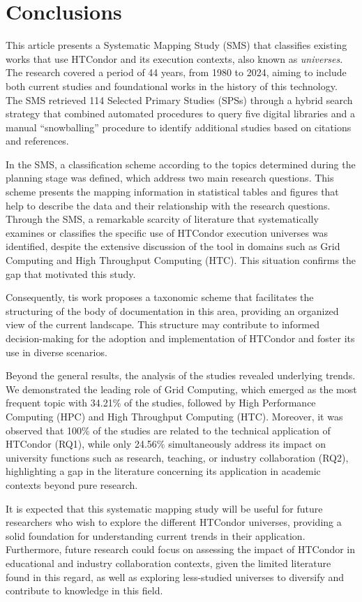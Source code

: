 \section{Conclusions}\label{sec:conclusiones}

This article presents a Systematic Mapping Study (SMS) that classifies existing works that use HTCondor and its execution contexts, also known as \textit{universes}. The research covered a period of 44 years, from 1980 to 2024, aiming to include both current studies and foundational works in the history of this technology. The SMS retrieved 114 Selected Primary Studies (SPSs) through a hybrid search strategy that combined automated procedures to query five digital libraries and a manual “snowballing” procedure to identify additional studies based on citations and references.

In the SMS, a classification scheme according to the topics determined during the planning stage was defined, which address two main research questions. This scheme presents the mapping information in statistical tables and figures that help to describe the data and their relationship with the research questions. Through the SMS, a remarkable scarcity of literature that systematically examines or classifies the specific use of HTCondor execution universes was identified, despite the extensive discussion of the tool in domains such as Grid Computing and High Throughput Computing (HTC). This situation confirms the gap that motivated this study.

Consequently, tis work proposes a taxonomic scheme that facilitates the structuring of the body of documentation in this area, providing an organized view of the current landscape. This structure may contribute to informed decision-making for the adoption and implementation of HTCondor and foster its use in diverse scenarios.

Beyond the general results, the analysis of the studies revealed underlying trends. We demonstrated the leading role of Grid Computing, which emerged as the most frequent topic with 34.21\% of the studies, followed by High Performance Computing (HPC) and High Throughput Computing (HTC). Moreover, it was observed that 100\% of the studies are related to the technical application of HTCondor (RQ1), while only 24.56\% simultaneously address its impact on university functions such as research, teaching, or industry collaboration (RQ2), highlighting a gap in the literature concerning its application in academic contexts beyond pure research.

It is expected that this systematic mapping study will be useful for future researchers who wish to explore the different HTCondor universes, providing a solid foundation for understanding current trends in their application. Furthermore, future research could focus on assessing the impact of HTCondor in educational and industry collaboration contexts, given the limited literature found in this regard, as well as exploring less-studied universes to diversify and contribute to knowledge in this field.

